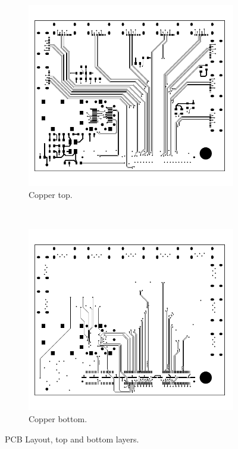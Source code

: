 \documentclass[main.tex]{subfiles}
\begin{document}
\begin{figure}[]
    \centering
    \begin{subfigure}[t]{0.7\textwidth}
        \centering
        \includegraphics[width=\linewidth, angle=0]{../img/pcb_top}
        \caption{Copper top.}
    \end{subfigure}%
    \\
    \begin{subfigure}[t]{0.7\textwidth}
        \centering
        \includegraphics[width=\linewidth, angle=0]{../img/pcb_btm}
        \caption{Copper bottom.}
    \end{subfigure}
    \caption{PCB Layout, top and bottom layers.}
    \label{fig:pcb_tb}
\end{figure}
\end{document}

